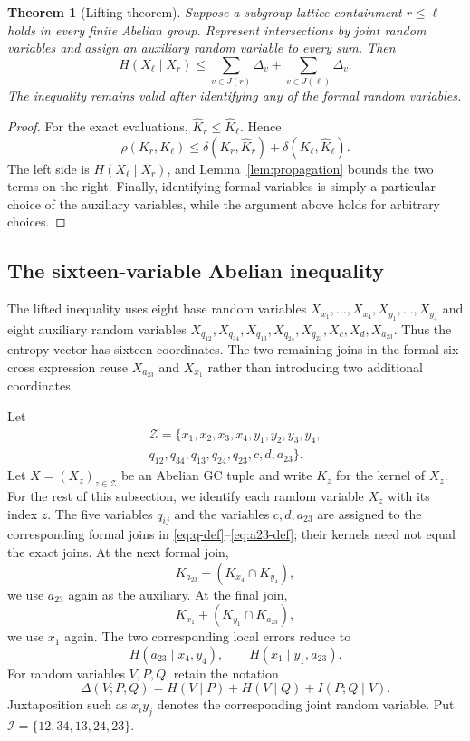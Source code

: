 \documentclass[journal]{IEEEtran}
\newtheorem{theorem}{Theorem}
\begin{document}
\begin{theorem}[Lifting theorem]\label{thm:defect-lift}
Suppose a subgroup-lattice containment $r\le \ell$ holds in every finite
Abelian group.  Represent intersections by joint random variables and assign an
auxiliary random variable to every sum.  Then
\begin{equation}\label{eq:defect-lift}
 H(X_\ell\mid X_r)
 \le
 \sum_{v\in J(r)}\Delta_v+
 \sum_{v\in J(\ell)}\Delta_v.
\end{equation}
The inequality remains valid after identifying any of the formal random
variables.
\end{theorem}
\begin{proof}
For the exact evaluations, $\widehat K_r\le\widehat K_\ell$.  Hence
\[
 \rho(K_r,K_\ell)
 \le \delta(K_r,\widehat K_r)+\delta(K_\ell,\widehat K_\ell).
\]
The left side is $H(X_\ell\mid X_r)$, and
Lemma~\ref{lem:propagation} bounds the two terms on the right.  Finally,
identifying formal variables is simply a particular choice of the auxiliary
variables, while the argument above holds for arbitrary choices.
\end{proof}

\subsection{The sixteen-variable Abelian inequality}\label{sec:sixteen-abelian}
The lifted inequality uses eight base random variables
$X_{x_1},\ldots,X_{x_4},X_{y_1},\ldots,X_{y_4}$ and eight auxiliary random
variables $X_{q_{12}},X_{q_{34}},X_{q_{13}},X_{q_{24}},X_{q_{23}},X_c,X_d,
X_{a_{23}}$.  Thus the entropy vector has sixteen coordinates.  The two
remaining joins in the formal six-cross expression reuse $X_{a_{23}}$ and
$X_{x_1}$ rather than introducing two additional coordinates.

Let
\begin{multline*}
 \mathcal Z=\{x_1,x_2,x_3,x_4,y_1,y_2,y_3,y_4,\\
 q_{12},q_{34},q_{13},q_{24},q_{23},c,d,a_{23}\}.
\end{multline*}
Let $X=(X_z)_{z\in\mathcal Z}$ be an Abelian GC tuple and write $K_z$ for the
kernel of $X_z$.  For the rest of this subsection, we identify each random
variable $X_z$ with its index $z$.  The five variables $q_{ij}$ and the variables
$c,d,a_{23}$ are assigned to the corresponding formal joins in
\eqref{eq:q-def}--\eqref{eq:a23-def}; their kernels need not equal the exact
joins.  At the next formal join,
\[
  K_{a_{23}}+(K_{x_4}\cap K_{y_4}),
\]
we use $a_{23}$ again as the auxiliary.  At the final join,
\[
  K_{x_1}+(K_{y_1}\cap K_{a_{23}}),
\]
we use $x_1$ again.  The two corresponding local errors reduce to
\[
 H(a_{23}\mid x_4,y_4),
 \qquad
 H(x_1\mid y_1,a_{23}).
\]
For random variables $V,P,Q$, retain the notation
\[
 \Delta(V;P,Q)=H(V\mid P)+H(V\mid Q)+I(P;Q\mid V).
\]
Juxtaposition such as $x_i y_j$ denotes the corresponding joint random
variable.  Put $\mathcal I=\{12,34,13,24,23\}$.
\end{document}
